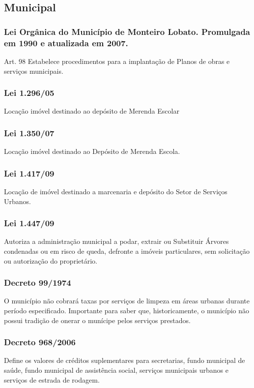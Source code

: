 \begin{subapend}
	\subsection{Municipal}
	\begin{subsubapend}
		\subsubsection{Lei Orgânica do Município de Monteiro Lobato. Promulgada em 1990 e atualizada em 2007.}
		Art. 98
		Estabelece procedimentos para a implantação de Planos de obras e serviços municipais.
		\subsubsection{Lei 1.296/05}
		Locação imóvel destinado ao depósito de Merenda Escolar
		\subsubsection{Lei 1.350/07}
		Locação imóvel destinado ao Depósito de Merenda Escola. 
		\subsubsection{Lei 1.417/09}
		Locação de imóvel destinado a marcenaria e depósito do Setor de Serviços Urbanos.
		\subsubsection{Lei 1.447/09}
		Autoriza a administração municipal a podar, extrair ou Substituir Árvores condenadas ou em risco de queda, defronte a imóveis particulares, sem solicitação ou autorização do proprietário.
		\subsubsection{Decreto 99/1974}
		O município não cobrará taxas por serviços de limpeza em áreas urbanas durante período especificado. Importante para saber que, historicamente, o município não possui tradição de onerar o munícipe pelos serviços prestados.
		\subsubsection{Decreto 968/2006}
		Define os valores de créditos suplementares para secretarias, fundo municipal de saúde, fundo municipal de assistência social, serviços municipais urbanos e serviços de estrada de rodagem.
	\end{subsubapend}
\end{subapend}

